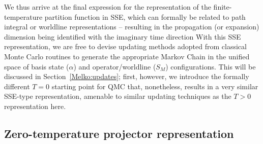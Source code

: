 \documentclass[vecphys]{svmult}
\begin{document}
We thus arrive at the final expression for the representation of the finite-temperature partition function in SSE, which 
can formally be related to path integral or worldline representations -- resulting in the propagation (or expansion) dimension being identified with the imaginary time direction \cite{Melko:HK,Melko:Assaad07}
With this SSE representation, we are free to devise updating methods adopted from classical Monte Carlo routines to generate the appropriate Markov Chain in the unified space of  basis state ($\alpha$) and operator/worldline ($S_M$) configurations.  This will be discussed in Section~\ref{Melko:updates}; first, however, we introduce the formally different $T=0$ starting point for QMC that, nonetheless, results in a very similar SSE-type representation, amenable to similar updating techniques as the $T > 0$ representation here.

\subsection{Zero-temperature projector representation} \label{secT0}
\end{document}
